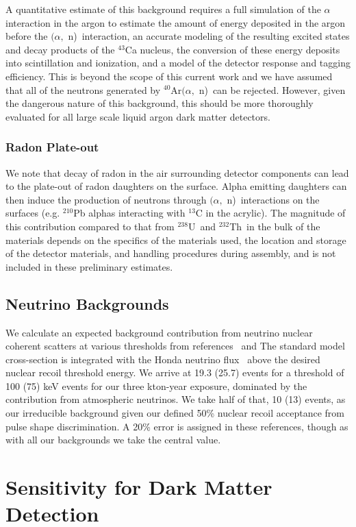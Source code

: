 \documentclass[a4paper,11pt]{article}
\newcommand{\ur}{$^{238}$U}
\newcommand{\thr}{$^{232}$Th}
\newcommand{\alphan}{$(\alpha,$ n)}
\begin{document}
A quantitative estimate of this background requires a full simulation of the $\alpha$ interaction in the argon to estimate the amount of energy deposited in the argon before the \alphan~interaction, an accurate modeling of the resulting excited states and decay products of the $^{43}$Ca nucleus, the conversion of these energy deposits into scintillation and ionization, and a model of the detector response and tagging efficiency. This is beyond the scope of this current work and we have assumed that all of the neutrons generated by $^{40}$Ar\alphan~can be rejected. However, given the dangerous nature of this background, this should be more thoroughly evaluated for all large scale liquid argon dark matter detectors.

\subsubsection{Radon Plate-out}
We note that decay of radon in the air surrounding detector components can lead to the plate-out of radon daughters on the surface. Alpha emitting daughters can then induce the production of neutrons through \alphan~interactions on the surfaces (e.g. $^{210}$Pb alphas interacting with $^{13}$C in the acrylic). The magnitude of this contribution compared to that from \ur~and \thr~in the bulk of the materials depends on the specifics of the materials used, the location and storage of the detector materials, and handling procedures during assembly, and is not included in these preliminary estimates. 

\subsection{Neutrino Backgrounds}
\label{sec:neutrino_calc}
We calculate an expected background contribution from neutrino nuclear coherent scatters at various thresholds from references~\cite{strigari1} and \cite{strigari2} The standard model cross-section is integrated with the Honda neutrino flux~\cite{honda} above the desired nuclear recoil threshold energy. We arrive at 19.3 (25.7) events for a threshold of 100 (75) keV events for our three kton-year exposure, dominated by the contribution from atmospheric neutrinos. We take half of that, 10 (13) events, as our irreducible background given our defined 50\% nuclear recoil acceptance from pulse shape discrimination. A 20\% error is assigned in these references, though as with all our backgrounds we take the central value.


\section{Sensitivity for Dark Matter Detection}
\end{document}
